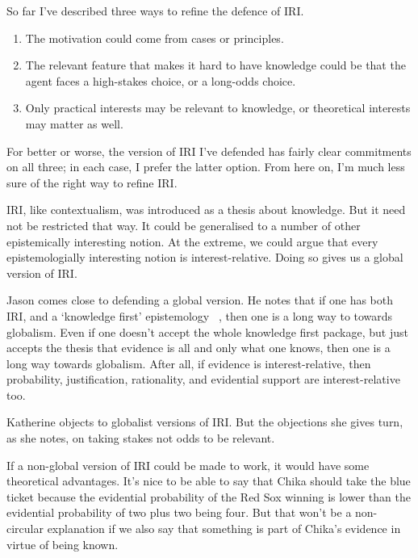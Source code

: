 \documentclass[11pt,oneside]{book}
\begin{document}
So far I've described three ways to refine the defence of IRI.

\begin{enumerate}
\item The motivation could come from cases or principles.

\item The relevant feature that makes it hard to have knowledge could be that the agent faces a high-stakes choice, or a long-odds choice.

\item Only practical interests may be relevant to knowledge, or theoretical interests may matter as well.

\end{enumerate}
For better or worse, the version of IRI I've defended has fairly clear commitments on all three; in each case, I prefer the latter option. From here on, I'm much less sure of the right way to refine IRI.

IRI, like contextualism, was introduced as a thesis about knowledge. But it need not be restricted that way. It could be generalised to a number of other epistemically interesting notion. At the extreme, we could argue that every epistemologially interesting notion is interest-relative. Doing so gives us a global version of IRI.

Jason  \citet{Stanley2005} comes close to defending a global version. He notes that if one has both IRI, and a `knowledge first' epistemology ~\citep{Williamson2000}, then one is a long way to towards globalism. Even if one doesn't accept the whole knowledge first package, but just accepts the thesis that evidence is all and only what one knows, then one is a long way towards globalism. After all, if evidence is interest-relative, then probability, justification, rationality, and evidential support are interest-relative too.

Katherine  \citet{Rubin2015} objects to globalist versions of IRI. But the objections she gives turn, as she notes, on taking stakes not odds to be relevant. 

If a non-global version of IRI could be made to work, it would have some theoretical advantages. It's nice to be able to say that Chika should take the blue ticket because the evidential probability of the Red Sox winning is lower than the evidential probability of two plus two being four. But that won't be a non-circular explanation if we also say that something is part of Chika's evidence in virtue of being known.
\end{document}

